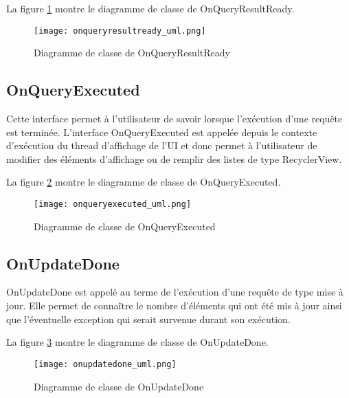 La figure \ref{fig:onqueryresultready_uml} montre le diagramme de classe de OnQueryResultReady.

\begin{figure}[htb]
\centering 
\texttt{[image: onqueryresultready\_uml.png]} 
\caption{Diagramme de classe de OnQueryResultReady}
\label{fig:onqueryresultready_uml}
 \end{figure}

\subsection{OnQueryExecuted}

Cette interface permet à l'utilisateur de savoir lorsque l'exécution d'une requête est terminée. L'interface OnQueryExecuted est appelée depuis le contexte d'exécution du thread d'affichage de l'UI et donc permet à l'utilisateur de modifier des éléments d'affichage ou de remplir des listes de type RecyclerView.

La figure \ref{fig:onqueryexecuted_uml} montre le diagramme de classe de OnQueryExecuted.

\begin{figure}[htb]
\centering 
\texttt{[image: onqueryexecuted\_uml.png]} 
\caption{Diagramme de classe de OnQueryExecuted}
\label{fig:onqueryexecuted_uml}
 \end{figure}

\subsection{OnUpdateDone}

OnUpdateDone est appelé au terme de l'exécution d'une requête de type mise à jour. Elle permet de connaître le nombre d'éléments qui ont été mis à jour ainsi que l'éventuelle exception qui serait survenue durant son exécution.

La figure \ref{fig:onupdatedone_uml} montre le diagramme de classe de OnUpdateDone.

\begin{figure}[htb]
\centering 
\texttt{[image: onupdatedone\_uml.png]} 
\caption{Diagramme de classe de OnUpdateDone}
\label{fig:onupdatedone_uml}
 \end{figure}
